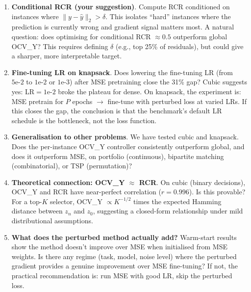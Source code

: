 \documentclass[11pt]{article}
\begin{document}
\begin{enumerate}[itemsep=6pt]

  \item \textbf{Conditional RCR (your suggestion)}.
    Compute RCR conditioned on instances where $\|y - \hat{y}\|_2 > \delta$.
    This isolates ``hard'' instances where the prediction is currently wrong
    and gradient signal matters most.  A natural question: does
    optimising for conditional RCR $\approx 0.5$ outperform global OCV\_Y?
    This requires defining $\delta$ (e.g., top 25\% of residuals),
    but could give a sharper, more interpretable target.

  \item \textbf{Fine-tuning LR on knapsack}.
    Does lowering the fine-tuning LR (from $5\text{e-}2$ to $1\text{e-}2$
    or $1\text{e-}3$) after MSE pretraining close the 31\% gap?
    Cubic suggests yes: LR$=1\text{e-}2$ broke the plateau for dense.
    On knapsack, the experiment is: MSE pretrain for $P$ epochs
    $\rightarrow$ fine-tune with perturbed loss at varied LRs.
    If this closes the gap, the conclusion is that the benchmark's
    default LR schedule is the bottleneck, not the loss function.

  \item \textbf{Generalisation to other problems}.
    We have tested cubic and knapsack.  Does the per-instance OCV\_Y
    controller consistently outperform global, and does it outperform MSE,
    on portfolio (continuous), bipartite matching (combinatorial),
    or TSP (permutation)?

  \item \textbf{Theoretical connection: OCV\_Y $\approx$ RCR}.
    On cubic (binary decisions), OCV\_Y and RCR have near-perfect
    correlation ($r = 0.996$).  Is this provable?
    For a top-$K$ selector, OCV\_Y $\propto K^{-1/2}$ times the expected
    Hamming distance between $z_n$ and $z_0$, suggesting a closed-form
    relationship under mild distributional assumptions.

  \item \textbf{What does the perturbed method actually add?}
    Warm-start results show the method doesn't improve over MSE when
    initialised from MSE weights.  Is there any regime (task, model,
    noise level) where the perturbed gradient provides a genuine
    improvement over MSE fine-tuning?  If not, the practical
    recommendation is: run MSE with good LR, skip the perturbed loss.

\end{enumerate}
\end{document}
